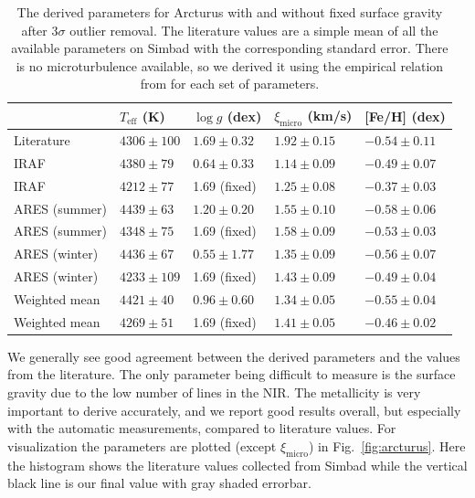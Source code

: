 \documentclass{aa}
\begin{document}
\begin{table}[htb!]
    \caption{The derived parameters for Arcturus with and without fixed surface
             gravity after 3$\sigma$ outlier removal. The literature values are
             a simple mean of all the available parameters on Simbad with the
             corresponding standard error. There is no microturbulence
             available, so we derived it using the empirical relation
             from \citet{Adibekyan2015} for each set of parameters.}
    \label{tab:arcturus}
    \centering
    \begin{tabular}{lllll}
      \hline\hline
                      & $T_\mathrm{eff}$ (K) &  $\log g$ (dex)  &   $\xi_\mathrm{micro}$ (km/s)   & [Fe/H] (dex)     \\
      \hline
        Literature    & $4306 \pm 100$       &  $1.69 \pm 0.32$ &    $1.92 \pm 0.15$              & $-0.54 \pm 0.11$ \\
      \hline
        IRAF          & $4380 \pm  79$       &  $0.64 \pm 0.33$ &    $1.14 \pm 0.09$              & $-0.49 \pm 0.07$ \\
        IRAF          & $4212 \pm  77$       &   1.69 (fixed)   &    $1.25 \pm 0.08$              & $-0.37 \pm 0.03$ \\
      \hline
        ARES (summer) & $4439 \pm  63$       &  $1.20 \pm 0.20$ &    $1.55 \pm 0.10$              & $-0.58 \pm 0.06$ \\
        ARES (summer) & $4348 \pm  75$       &   1.69 (fixed)   &    $1.58 \pm 0.09$              & $-0.53 \pm 0.03$ \\
        ARES (winter) & $4436 \pm  67$       &  $0.55 \pm 1.77$ &    $1.35 \pm 0.09$              & $-0.56 \pm 0.07$ \\
        ARES (winter) & $4233 \pm 109$       &   1.69 (fixed)   &    $1.43 \pm 0.09$              & $-0.49 \pm 0.04$ \\
      \hline
        Weighted mean & $4421 \pm  40$       &  $0.96 \pm 0.60$ &    $1.34 \pm 0.05$              & $-0.55 \pm 0.04$ \\
        Weighted mean & $4269 \pm  51$       &   1.69 (fixed)   &    $1.41 \pm 0.05$              & $-0.46 \pm 0.02$ \\
      \hline
    \end{tabular}
\end{table}

We generally see good agreement between the derived parameters and the values
from the literature. The only parameter being difficult to measure is the
surface gravity due to the low number of  lines in the NIR. The
metallicity is very important to derive accurately, and we report good results
overall, but especially with the automatic measurements, compared to literature
values. For visualization the parameters are plotted (except
$\xi_\mathrm{micro}$) in Fig.~\ref{fig:arcturus}. Here the histogram shows the
literature values collected from Simbad while the vertical black line is our
final value with gray shaded errorbar.
\end{document}
